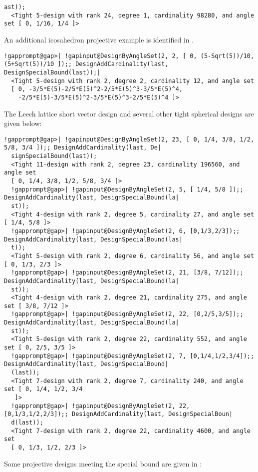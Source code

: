 \documentclass[a4paper,11pt]{report}
\begin{document}
{{\begin{Verbatim}[commandchars=!@|,fontsize=\small,frame=single,label=Example]
  ast));
  <Tight 5-design with rank 24, degree 1, cardinality 98280, and angle set [ 0, 1/16, 1/4 ]>
\end{Verbatim}
 An additional icosahedron projective example is identified in \cite{lyubich_tight_2009}. 
\begin{Verbatim}[commandchars=!@|,fontsize=\small,frame=single,label=Example]
  !gapprompt@gap>| !gapinput@DesignByAngleSet(2, 2, [ 0, (5-Sqrt(5))/10, (5+Sqrt(5))/10 ]);; DesignAddCardinality(last, DesignSpecialBound(last));|
  <Tight 5-design with rank 2, degree 2, cardinality 12, and angle set
  [ 0, -3/5*E(5)-2/5*E(5)^2-2/5*E(5)^3-3/5*E(5)^4,
    -2/5*E(5)-3/5*E(5)^2-3/5*E(5)^3-2/5*E(5)^4 ]>
\end{Verbatim}
 The Leech lattice short vector design and several other tight spherical
designs are given below: 
\begin{Verbatim}[commandchars=!@|,fontsize=\small,frame=single,label=Example]
  !gapprompt@gap>| !gapinput@DesignByAngleSet(2, 23, [ 0, 1/4, 3/8, 1/2, 5/8, 3/4 ]);; DesignAddCardinality(last, De|
  signSpecialBound(last));
  <Tight 11-design with rank 2, degree 23, cardinality 196560, and angle set
  [ 0, 1/4, 3/8, 1/2, 5/8, 3/4 ]>
  !gapprompt@gap>| !gapinput@DesignByAngleSet(2, 5, [ 1/4, 5/8 ]);; DesignAddCardinality(last, DesignSpecialBound(la|
  st));
  <Tight 4-design with rank 2, degree 5, cardinality 27, and angle set [ 1/4, 5/8 ]>
  !gapprompt@gap>| !gapinput@DesignByAngleSet(2, 6, [0,1/3,2/3]);; DesignAddCardinality(last, DesignSpecialBound(las|
  t));
  <Tight 5-design with rank 2, degree 6, cardinality 56, and angle set [ 0, 1/3, 2/3 ]>
  !gapprompt@gap>| !gapinput@DesignByAngleSet(2, 21, [3/8, 7/12]);; DesignAddCardinality(last, DesignSpecialBound(la|
  st));
  <Tight 4-design with rank 2, degree 21, cardinality 275, and angle set [ 3/8, 7/12 ]>
  !gapprompt@gap>| !gapinput@DesignByAngleSet(2, 22, [0,2/5,3/5]);; DesignAddCardinality(last, DesignSpecialBound(la|
  st));
  <Tight 5-design with rank 2, degree 22, cardinality 552, and angle set [ 0, 2/5, 3/5 ]>
  !gapprompt@gap>| !gapinput@DesignByAngleSet(2, 7, [0,1/4,1/2,3/4]);; DesignAddCardinality(last, DesignSpecialBound|
  (last));
  <Tight 7-design with rank 2, degree 7, cardinality 240, and angle set [ 0, 1/4, 1/2, 3/4
   ]>
  !gapprompt@gap>| !gapinput@DesignByAngleSet(2, 22, [0,1/3,1/2,2/3]);; DesignAddCardinality(last, DesignSpecialBoun|
  d(last));
  <Tight 7-design with rank 2, degree 22, cardinality 4600, and angle set
  [ 0, 1/3, 1/2, 2/3 ]>
\end{Verbatim}
 Some projective designs meeting the special bound are given in \cite[Examples 1-11]{hoggar_t-designs_1982}: 
}}
\end{document}
